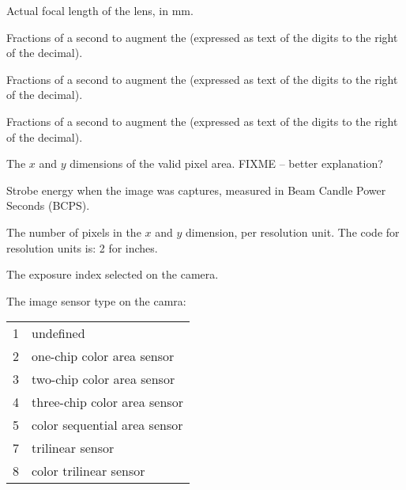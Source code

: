 Actual focal length of the lens, in mm.
\apiend


Fractions of a second to augment the  (expressed
as text of the digits to the right of the decimal).
\apiend

Fractions of a second to augment the  (expressed
as text of the digits to the right of the decimal).
\apiend

Fractions of a second to augment the  (expressed
as text of the digits to the right of the decimal).
\apiend


The $x$ and $y$ dimensions of the valid pixel area.
FIXME -- better explanation?
\apiend


Strobe energy when the image was captures, measured in Beam Candle Power
Seconds (BCPS).
\apiend


The number of pixels in the $x$ and $y$ dimension, per resolution unit.
The code for resolution units is: 2 for inches.
\apiend



The exposure index selected on the camera.
\apiend

The image sensor type on the camra:
\medskip

\begin{tabular}{p{0.3in} p{4in}}
1 & undefined \\
2 & one-chip color area sensor \\
3 & two-chip color area sensor \\
4 & three-chip color area sensor \\
5 & color sequential area sensor \\
7 & trilinear sensor \\
8 & color trilinear sensor 
\end{tabular}
\apiend

